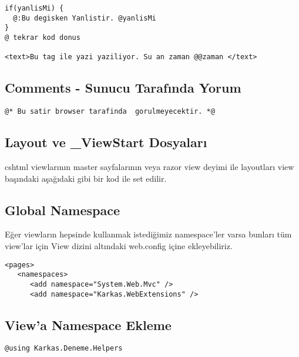 \documentclass[10pt,a4paper]{article}
\begin{document}
\begin{lstlisting}[label=code-TextAndMarkup,caption=Yazı ve Markup]
if(yanlisMi) {
  @:Bu degisken Yanlistir. @yanlisMi
}
@ tekrar kod donus

<text>Bu tag ile yazi yaziliyor. Su an zaman @@zaman </text>
\end{lstlisting}


\subsection{Comments - Sunucu Tarafında Yorum}

\begin{lstlisting}[label=code-Comment,caption=Comment - Yorum]
@* Bu satir browser tarafinda  gorulmeyecektir. *@
\end{lstlisting}


\subsection{Layout ve \_ViewStart Dosyaları}
cshtml viewlarının master sayfalarının veya razor view deyimi ile layoutları
view başındaki aşağıdaki gibi bir kod ile set edilir.



\subsection{Global Namespace}
Eğer viewların hepsinde kullanmak istediğimiz namespace'ler varsa bunları tüm view'lar için View dizini altındaki web.config
içine ekleyebiliriz.

\begin{lstlisting}[label=code-GlobalNamespace,caption=Global Namespace Ekleme]
<pages>
   <namespaces>
      <add namespace="System.Web.Mvc" />
      <add namespace="Karkas.WebExtensions" />
\end{lstlisting}


\subsection{View'a Namespace Ekleme}
\begin{lstlisting}[label=code-ViewNamespace,caption=View Namespace Ekleme]
@using Karkas.Deneme.Helpers
\end{lstlisting}






% 

\end{document}
